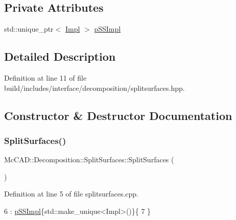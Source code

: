 \subsection*{Private Attributes}
\begin{DoxyCompactItemize}
\item 
std\+::unique\+\_\+ptr$<$ \hyperlink{classMcCAD_1_1Decomposition_1_1SplitSurfaces_1_1Impl}{Impl} $>$ \hyperlink{classMcCAD_1_1Decomposition_1_1SplitSurfaces_a0cc9726e3748cbdcaa63533baca3959d}{p\+S\+S\+Impl}
\end{DoxyCompactItemize}


\subsection{Detailed Description}


Definition at line 11 of file build/includes/interface/decomposition/splitsurfaces.\+hpp.



\subsection{Constructor \& Destructor Documentation}
\mbox{\label{classMcCAD_1_1Decomposition_1_1SplitSurfaces_af0b06b75edbe1c2c45c2d8a3259b9985}} 
\subsubsection{\texorpdfstring{Split\+Surfaces()}{SplitSurfaces()}\hspace{0.1cm}{\footnotesize\ttfamily [1/2]}}
{\footnotesize\ttfamily Mc\+C\+A\+D\+::\+Decomposition\+::\+Split\+Surfaces\+::\+Split\+Surfaces (\begin{DoxyParamCaption}{ }\end{DoxyParamCaption})}



Definition at line 5 of file splitsurfaces.\+cpp.


\begin{DoxyCode}
6   : \hyperlink{classMcCAD_1_1Decomposition_1_1SplitSurfaces_a0cc9726e3748cbdcaa63533baca3959d}{pSSImpl}\{std::make\_unique<Impl>()\}\{
7 \}
\end{DoxyCode}
\mbox{\label{classMcCAD_1_1Decomposition_1_1SplitSurfaces_af963eef101d51ba4a0b1f112f29c5aa8}} 
